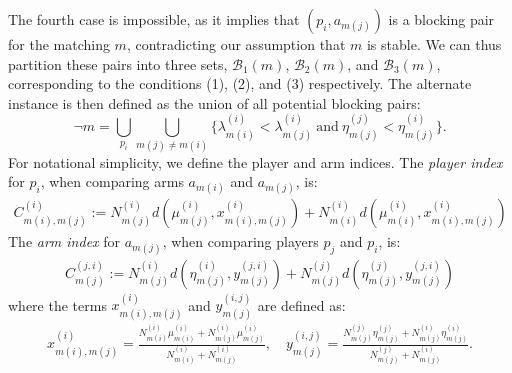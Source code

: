 \documentclass{article}
\newtheorem{lemma}[theorem]{Lemma}
\begin{document}
The fourth case is impossible, as it implies that $(p_i,a_{m(j)})$ is a blocking pair for the matching $m$, contradicting our assumption that $m$ is stable. We can thus partition these pairs into three sets, $\mathcal{B}_1(m)$, $\mathcal{B}_2(m)$, and $\mathcal{B}_3(m)$, corresponding to the conditions (1), (2), and (3) respectively. The alternate instance is then defined as the union of all potential blocking pairs:
\[
 \neg m = \bigcup_{p_i}\bigcup_{m(j)\neq m(i)}\{\lambda^{(i)}_{m(i)} < \lambda^{(i)}_{m(j)}\ \text{and}\ \eta^{(j)}_{m(j)} < \eta^{(i)}_{m(j)}\}.
\]
For notational simplicity, we define the player and arm indices. The \textit{player index} for $p_i$, when comparing arms $a_{m(i)}$ and $a_{m(j)}$, is:
\begin{align*}
    C^{(i)}_{m(i),m(j)} := N^{(i)}_{m(j)} d\left(\mu^{(i)}_{m(j)}, x^{(i)}_{m(i),m(j)}\right) + N^{(i)}_{m(i)} d\left(\mu^{(i)}_{m(i)}, x^{(i)}_{m(i),m(j)}\right)
\end{align*}
The \textit{arm index} for $a_{m(j)}$, when comparing players $p_j$ and $p_i$, is:
\begin{align*}
    C^{(j,i)}_{m(j)} := N^{(i)}_{m(j)} d\left(\eta^{(i)}_{m(j)}, y^{(j,i)}_{m(j)}\right) + N^{(j)}_{m(j)} d\left(\eta^{(j)}_{m(j)}, y^{(j,i)}_{m(j)}\right)
\end{align*}
where the terms $x^{(i)}_{m(i),m(j)}$ and $y^{(i,j)}_{m(j)}$ are defined as:
\begin{align*}
    x^{(i)}_{m(i),m(j)} = \frac{N^{(i)}_{m(i)}\mu^{(i)}_{m(i)} + N^{(i)}_{m(j)}\mu^{(i)}_{m(j)}}{N^{(i)}_{m(i)} + N^{(i)}_{m(j)}}, \quad 
    y^{(i,j)}_{m(j)} = \frac{N^{(j)}_{m(j)}\eta^{(j)}_{m(j)} + N^{(i)}_{m(j)}\eta^{(i)}_{m(j)}}{N^{(j)}_{m(j)} + N^{(i)}_{m(j)}}.
\end{align*}
\end{document}
